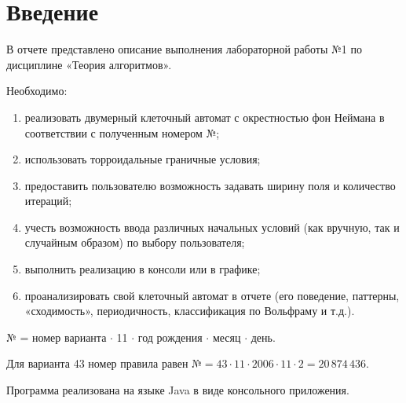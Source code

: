\section*{Введение}
{}

В отчете представлено описание выполнения лабораторной работы №1 по дисциплине «Теория алгоритмов».

Необходимо:
\begin{enumerate}
	\item реализовать двумерный клеточный автомат с окрестностью фон Неймана в соответствии с полученным номером №;
	\item использовать торроидальные граничные условия;
	\item предоставить пользователю возможность задавать ширину поля и количество итераций;
	\item учесть возможность ввода различных начальных условий (как вручную, так и случайным образом) по выбору пользователя;
	\item выполнить реализацию в консоли или в графике;
	\item проанализировать свой клеточный автомат в отчете (его поведение, паттерны, «сходимость», периодичность, классификация по Вольфраму и т.д.).
\end{enumerate}

№ = номер варианта $\cdot$ 11 $\cdot$ год рождения $\cdot$ месяц $\cdot$ день.

Для варианта 43 номер правила равен $\text{№} = 43 \cdot 11 \cdot 2006 \cdot 11 \cdot 2 = 20\,874\,436.$

Программа реализована на языке Java в виде консольного приложения. %
